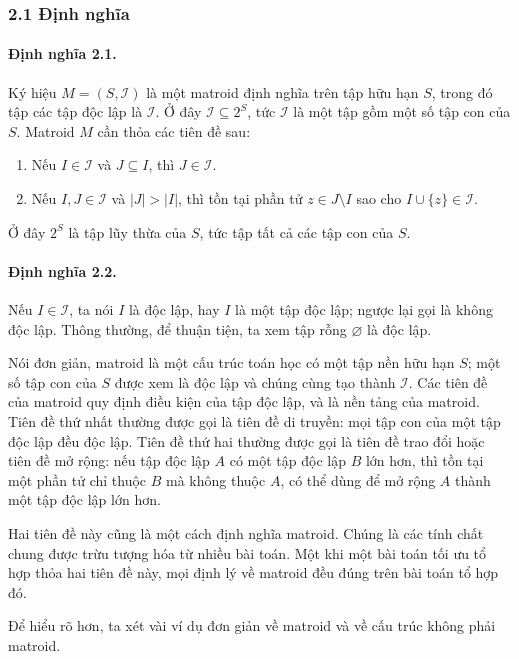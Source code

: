 \documentclass[11pt]{article}
\begin{document}
\subsubsection*{2.1 Định nghĩa}

\paragraph{Định nghĩa 2.1.}
Ký hiệu \(M=(S,\mathcal I)\) là một matroid định nghĩa trên tập hữu hạn \(S\),
trong đó tập các tập độc lập là \(\mathcal I\). Ở đây
\(\mathcal I\subseteq 2^S\), tức \(\mathcal I\) là một tập gồm một số tập con
của \(S\). Matroid \(M\) cần thỏa các tiên đề sau:
\begin{enumerate}
  \item Nếu \(I\in\mathcal I\) và \(J\subseteq I\), thì
  \(J\in\mathcal I\).
  \item Nếu \(I,J\in\mathcal I\) và \(|J|>|I|\), thì tồn tại phần tử
  \(z\in J\setminus I\) sao cho \(I\cup\{z\}\in\mathcal I\).
\end{enumerate}
Ở đây \(2^S\) là tập lũy thừa của \(S\), tức tập tất cả các tập con của \(S\).

\paragraph{Định nghĩa 2.2.}
Nếu \(I\in\mathcal I\), ta nói \(I\) là độc lập, hay \(I\) là một tập độc lập;
ngược lại gọi là không độc lập. Thông thường, để thuận tiện, ta xem tập rỗng
\(\varnothing\) là độc lập.

Nói đơn giản, matroid là một cấu trúc toán học có một tập nền hữu hạn \(S\);
một số tập con của \(S\) được xem là độc lập và chúng cùng tạo thành
\(\mathcal I\). Các tiên đề của matroid quy định điều kiện của tập độc lập, và
là nền tảng của matroid. Tiên đề thứ nhất thường được gọi là tiên đề di truyền:
mọi tập con của một tập độc lập đều độc lập. Tiên đề thứ hai thường được gọi là
tiên đề trao đổi hoặc tiên đề mở rộng: nếu tập độc lập \(A\) có một tập độc lập
\(B\) lớn hơn, thì tồn tại một phần tử chỉ thuộc \(B\) mà không thuộc \(A\), có
thể dùng để mở rộng \(A\) thành một tập độc lập lớn hơn.

Hai tiên đề này cũng là một cách định nghĩa matroid. Chúng là các tính chất
chung được trừu tượng hóa từ nhiều bài toán. Một khi một bài toán tối ưu tổ hợp
thỏa hai tiên đề này, mọi định lý về matroid đều đúng trên bài toán tổ hợp đó.

Để hiểu rõ hơn, ta xét vài ví dụ đơn giản về matroid và về cấu trúc không phải
matroid.
\end{document}
